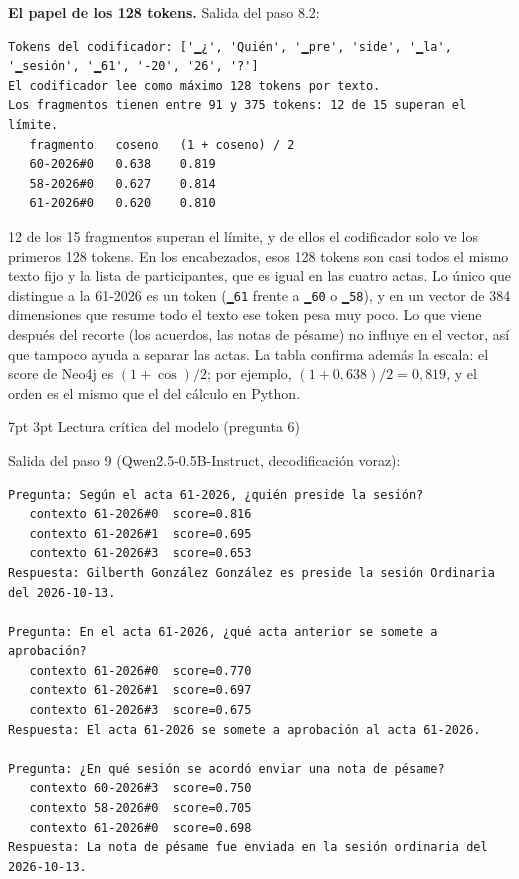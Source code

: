 \documentclass[10pt,letterpaper]{article}
\makeatletter
\renewcommand\section{\@startsection{section}{1}{\z@}%
  {7pt \@plus 2pt \@minus 1pt}{3pt}%
  {\normalfont\normalsize\bfseries\color{acc}}}
\makeatother
\begin{document}
\textbf{El papel de los 128 tokens.} Salida del paso 8.2:
\begin{Verbatim}
Tokens del codificador: ['▁¿', 'Quién', '▁pre', 'side', '▁la', '▁sesión', '▁61', '-20', '26', '?']
El codificador lee como máximo 128 tokens por texto.
Los fragmentos tienen entre 91 y 375 tokens: 12 de 15 superan el límite.
   fragmento   coseno   (1 + coseno) / 2
   60-2026#0   0.638    0.819
   58-2026#0   0.627    0.814
   61-2026#0   0.620    0.810
\end{Verbatim}
12 de los 15 fragmentos superan el límite, y de ellos el codificador solo ve los primeros 128 tokens.
En los encabezados, esos 128 tokens son casi todos el mismo texto fijo y la lista de participantes,
que es igual en las cuatro actas. Lo único que distingue a la 61-2026 es un token (\texttt{▁61} frente
a \texttt{▁60} o \texttt{▁58}), y en un vector de 384 dimensiones que resume todo el texto ese token pesa
muy poco. Lo que viene después del recorte (los acuerdos, las notas de pésame) no influye en el vector,
así que tampoco ayuda a separar las actas. La tabla confirma además la escala: el score de Neo4j es
$(1+\cos)/2$; por ejemplo, $(1+0{,}638)/2 = 0{,}819$, y el orden es el mismo que el del cálculo en Python.

\section{Lectura crítica del modelo (pregunta 6)}

Salida del paso 9 (Qwen2.5-0.5B-Instruct, decodificación voraz):
\begin{Verbatim}
Pregunta: Según el acta 61-2026, ¿quién preside la sesión?
   contexto 61-2026#0  score=0.816
   contexto 61-2026#1  score=0.695
   contexto 61-2026#3  score=0.653
Respuesta: Gilberth González González es preside la sesión Ordinaria del 2026-10-13.

Pregunta: En el acta 61-2026, ¿qué acta anterior se somete a aprobación?
   contexto 61-2026#0  score=0.770
   contexto 61-2026#1  score=0.697
   contexto 61-2026#3  score=0.675
Respuesta: El acta 61-2026 se somete a aprobación al acta 61-2026.

Pregunta: ¿En qué sesión se acordó enviar una nota de pésame?
   contexto 60-2026#3  score=0.750
   contexto 58-2026#0  score=0.705
   contexto 61-2026#0  score=0.698
Respuesta: La nota de pésame fue enviada en la sesión ordinaria del 2026-10-13.
\end{Verbatim}
\end{document}
